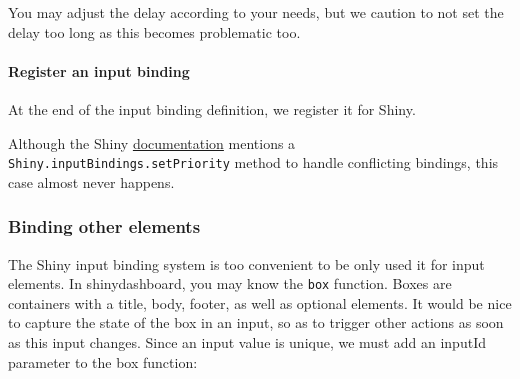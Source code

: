 \documentclass[]{book}
\newenvironment{Shaded}{\begin{snugshade}}{\end{snugshade}}
\newcommand{\AttributeTok}[1]{\textcolor[rgb]{0.77,0.63,0.00}{#1}}
\newcommand{\CommentTok}[1]{\textcolor[rgb]{0.56,0.35,0.01}{\textit{#1}}}
\newcommand{\KeywordTok}[1]{\textcolor[rgb]{0.13,0.29,0.53}{\textbf{#1}}}
\newcommand{\NormalTok}[1]{#1}
\newcommand{\OperatorTok}[1]{\textcolor[rgb]{0.81,0.36,0.00}{\textbf{#1}}}
\newcommand{\StringTok}[1]{\textcolor[rgb]{0.31,0.60,0.02}{#1}}
\newcommand{\VariableTok}[1]{\textcolor[rgb]{0.00,0.00,0.00}{#1}}
\let\oldparagraph\paragraph
\renewcommand{\paragraph}[1]{\oldparagraph{#1}\mbox{}}
\begin{document}
You may adjust the delay according to your needs, but we caution to not set the delay too long as this becomes problematic too.

\hypertarget{register-an-input-binding}{%
\paragraph{Register an input binding}\label{register-an-input-binding}}

At the end of the input binding definition, we register it for Shiny.

\begin{Shaded}
\end{Shaded}

Although the Shiny \href{https://shiny.rstudio.com/articles/building-inputs.html}{documentation} mentions a \texttt{Shiny.inputBindings.setPriority} method to handle conflicting bindings, this case almost never happens.

\hypertarget{binding-other-elements}{%
\subsubsection{Binding other elements}\label{binding-other-elements}}

The Shiny input binding system is too convenient to be only used it for input elements. In shinydashboard, you may know the \texttt{box} function. Boxes are containers with a title, body, footer, as well as optional elements. It would be nice to capture the state of the box in an input, so as to trigger other actions as soon as this input changes. Since an input value is unique, we must add an inputId parameter to the box function:
\end{document}
